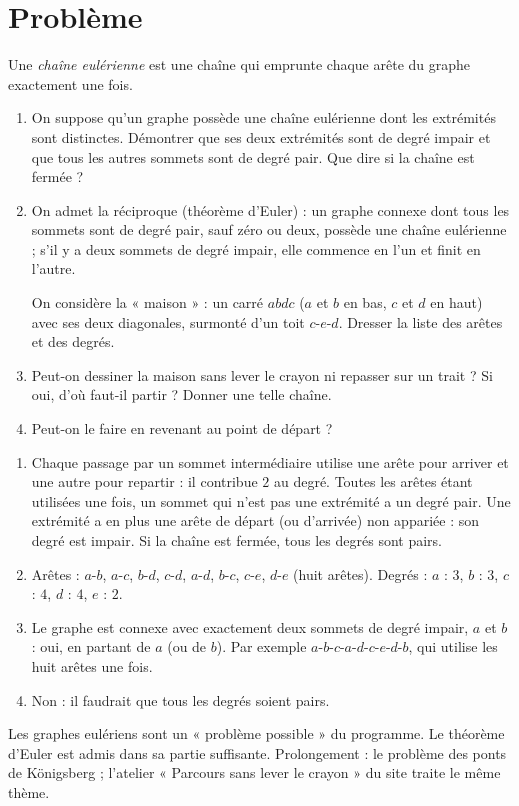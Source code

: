\mxnewpage
\section{Problème}
\begin{problem}
Une \emph{chaîne eulérienne} est une chaîne qui emprunte chaque arête du graphe exactement une fois.
\begin{enumerate}
\item On suppose qu'un graphe possède une chaîne eulérienne dont les extrémités sont distinctes. Démontrer que ses deux extrémités sont de degré impair et que tous les autres sommets sont de degré pair. Que dire si la chaîne est fermée ?
\item On admet la réciproque (théorème d'Euler) : un graphe connexe dont tous les sommets sont de degré pair, sauf zéro ou deux, possède une chaîne eulérienne ; s'il y a deux sommets de degré impair, elle commence en l'un et finit en l'autre.\par
On considère la « maison » : un carré $abdc$ ($a$ et $b$ en bas, $c$ et $d$ en haut) avec ses deux diagonales, surmonté d'un toit $c$-$e$-$d$. Dresser la liste des arêtes et des degrés.
\item Peut-on dessiner la maison sans lever le crayon ni repasser sur un trait ? Si oui, d'où faut-il partir ? Donner une telle chaîne.
\item Peut-on le faire en revenant au point de départ ?
\end{enumerate}
\end{problem}
\begin{solution}[Problème]
\begin{enumerate}
\item Chaque passage par un sommet intermédiaire utilise une arête pour arriver et une autre pour repartir : il contribue $2$ au degré. Toutes les arêtes étant utilisées une fois, un sommet qui n'est pas une extrémité a un degré pair. Une extrémité a en plus une arête de départ (ou d'arrivée) non appariée : son degré est impair. Si la chaîne est fermée, tous les degrés sont pairs.
\item Arêtes : $a$-$b$, $a$-$c$, $b$-$d$, $c$-$d$, $a$-$d$, $b$-$c$, $c$-$e$, $d$-$e$ (huit arêtes). Degrés : $a$ : $3$, $b$ : $3$, $c$ : $4$, $d$ : $4$, $e$ : $2$.
\item Le graphe est connexe avec exactement deux sommets de degré impair, $a$ et $b$ : oui, en partant de $a$ (ou de $b$). Par exemple $a$-$b$-$c$-$a$-$d$-$c$-$e$-$d$-$b$, qui utilise les huit arêtes une fois.
\item Non : il faudrait que tous les degrés soient pairs.
\end{enumerate}
\end{solution}
\begin{teachernote}
Les graphes eulériens sont un « problème possible » du programme. Le théorème d'Euler est admis dans sa partie suffisante. Prolongement : le problème des ponts de Königsberg ; l'atelier « Parcours sans lever le crayon » du site traite le même thème.
\end{teachernote}
